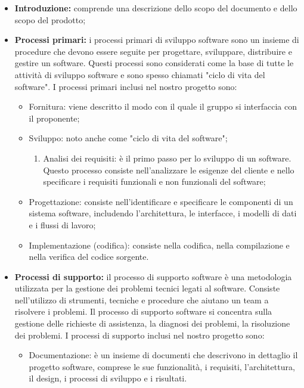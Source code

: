 \begin{itemize}
\item \textbf{Introduzione:} comprende una descrizione dello scopo del documento e dello scopo del prodotto;

\item \textbf{Processi primari:} i processi primari di sviluppo software sono un insieme di procedure che devono essere seguite per progettare, sviluppare, distribuire e gestire un software. 
Questi processi sono considerati come la base di tutte le attività di sviluppo software e sono spesso chiamati "ciclo di vita del software". 
I processi primari inclusi nel nostro progetto sono:
\begin{itemize}
    \item Fornitura: viene descritto il modo con il quale il gruppo si interfaccia con il proponente;
    \item Sviluppo: noto anche come "ciclo di vita del software";
        \begin{enumerate}
            \item Analisi dei requisiti: è il primo passo per lo sviluppo di un software. Questo processo consiste nell'analizzare le esigenze del cliente e nello specificare i requisiti funzionali e non funzionali del software;
        \end{enumerate}
    \item Progettazione: consiste nell'identificare e specificare le componenti di un sistema software, includendo l'architettura, le interfacce, i modelli di dati e i flussi di lavoro;
    \item Implementazione (codifica): consiste nella codifica, nella compilazione e nella verifica del codice sorgente.
\end{itemize}
\item \textbf{Processi di supporto:} il processo di supporto software è una metodologia utilizzata per la gestione dei problemi tecnici legati al software. 
Consiste nell'utilizzo di strumenti, tecniche e procedure che aiutano un team a risolvere i problemi. 
Il processo di supporto software si concentra sulla gestione delle richieste di assistenza, la diagnosi dei problemi, la risoluzione dei problemi.
I processi di supporto inclusi nel nostro progetto sono:
\begin{itemize}
    \item Documentazione: è un insieme di documenti che descrivono in dettaglio il progetto software, comprese le sue funzionalità, i requisiti, l'architettura, il design, i processi di sviluppo e i risultati. 

\end{itemize}
\end{itemize}
